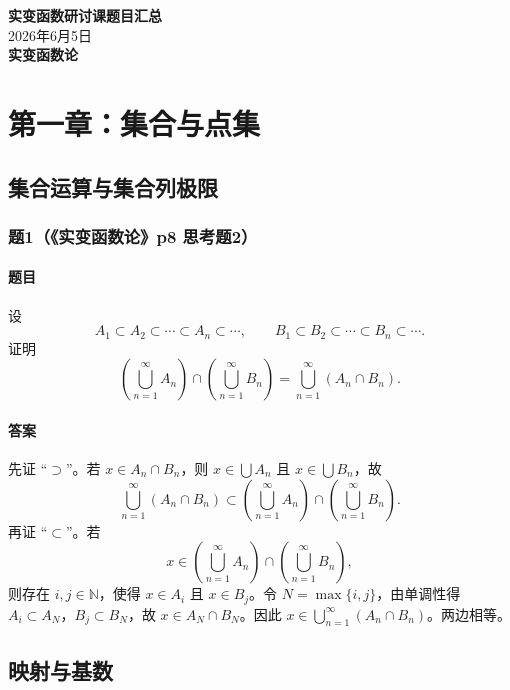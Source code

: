 \documentclass{article}
\newcommand{\N}{\mathbb{N}}
\begin{document}
	
	\begin{center}
		{\LARGE \textbf{实变函数研讨课题目汇总}}\\[0.3cm]
		{\large 2026年6月5日}\\[0.3cm]
		{\Large \textbf{实变函数论}}
	\end{center}
	
	\section{第一章：集合与点集}
	
	\subsection{集合运算与集合列极限}
	
	\subsubsection*{题1（《实变函数论》p8 思考题2）}
	\paragraph{题目}设
	\[
	A_1\subset A_2\subset\cdots\subset A_n\subset\cdots,\qquad
	B_1\subset B_2\subset\cdots\subset B_n\subset\cdots .
	\]
	证明
	\[
	\left(\bigcup_{n=1}^{\infty}A_n\right)\cap
	\left(\bigcup_{n=1}^{\infty}B_n\right)
	=\bigcup_{n=1}^{\infty}(A_n\cap B_n).
	\]
	
	\paragraph{答案}先证 ``$\supset$''。若 $x\in A_n\cap B_n$，则 $x\in\bigcup A_n$ 且 $x\in\bigcup B_n$，故
	\[
	\bigcup_{n=1}^{\infty}(A_n\cap B_n)
	\subset
	\left(\bigcup_{n=1}^{\infty}A_n\right)\cap
	\left(\bigcup_{n=1}^{\infty}B_n\right).
	\]
	再证 ``$\subset$''。若
	\[
	x\in \left(\bigcup_{n=1}^{\infty}A_n\right)\cap
	\left(\bigcup_{n=1}^{\infty}B_n\right),
	\]
	则存在 $i,j\in\N$，使得 $x\in A_i$ 且 $x\in B_j$。令 $N=\max\{i,j\}$，由单调性得 $A_i\subset A_N$，$B_j\subset B_N$，故 $x\in A_N\cap B_N$。因此 $x\in\bigcup_{n=1}^{\infty}(A_n\cap B_n)$。两边相等。
	
	\subsection{映射与基数}
	
\end{document}
